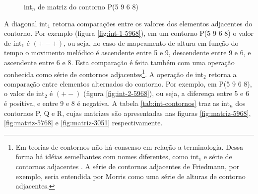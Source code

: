 \begin{figure}
  \centering
  \qquad
  \qquad
  \caption{int$_n$ de matriz do contorno P(5 9 6 8)}
  \label{fig:int-exemplos}
\end{figure}

A diagonal int$_1$ retorna comparações entre os valores dos elementos
adjacentes do contorno. Por exemplo (figura \ref{fig:int-1-5968}), em
um contorno P(5 9 6 8) o valor de int$_1$ é $(+ - +)$, ou seja, no
caso de mapeamento de altura em função do tempo o movimento melódico é
ascendente entre 5 e 9, descendente entre 9 e 6, e ascendente entre 6
e 8. Esta comparação é feita também com uma operação conhecida como
série de contornos adjacentes\footnote{Em teorias de contornos não há
  consenso em relação a terminologia. Dessa forma há idéias
  semelhantes com nomes diferentes, como int$_1$ e série de contornos
  adjacentes \cite{friedmann87:response}. A série de contornos
  adjacentes de Friedmann, por exemplo, seria entendida por Morris
  como uma série de alturas de contorno adjacentes.}. A operação de
int$_2$ retorna a comparação entre elementos alternados do
contorno. Por exemplo, em P(5 9 6 8), o valor de int$_2$ é $(+ -)$
(figura \ref{fig:int-2-5968}), ou seja, a diferença entre 5 e 6 é
positiva, e entre 9 e 8 é negativa. A tabela \ref{tab:int-contornos}
traz as int$_n$ dos contornos P, Q e R, cujas matrizes são
apresentadas nas figuras \ref{fig:matriz-5968}, \ref{fig:matriz-5768}
e \ref{fig:matriz-3051} respectivamente.

